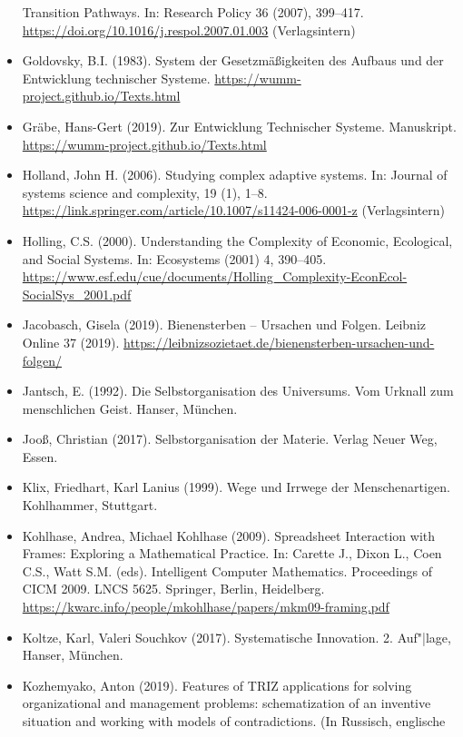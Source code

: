\documentclass[11pt,a4paper]{article}
\begin{document}
\begin{itemize}
  Transition Pathways. In: Research Policy 36 (2007), 399–417.\\
  \url{https://doi.org/10.1016/j.respol.2007.01.003} (Verlagsintern)
\item Goldovsky, B.I. (1983). System der Gesetzmäßigkeiten des Aufbaus und der
  Entwicklung technischer Systeme.
  \url{https://wumm-project.github.io/Texts.html} 
\item Gräbe, Hans-Gert (2019). Zur Entwicklung Technischer Systeme.
  Manuskript. \\ \url{https://wumm-project.github.io/Texts.html}
\item Holland, John H. (2006). Studying complex adaptive systems. In: Journal
  of systems science and complexity, 19 (1),
  1–8.\\ \url{https://link.springer.com/article/10.1007/s11424-006-0001-z}
  (Verlagsintern)
\item Holling, C.S. (2000). Understanding the Complexity of Economic,
  Ecological, and Social Systems. In: Ecosystems (2001) 4, 390–405.
  \url{https://www.esf.edu/cue/documents/Holling_Complexity-EconEcol-SocialSys_2001.pdf}
\item Jacobasch, Gisela (2019). Bienensterben -- Ursachen und Folgen.  Leibniz
  Online 37 (2019).
  \url{https://leibnizsozietaet.de/bienensterben-ursachen-und-folgen/}
\item Jantsch, E. (1992). Die Selbstorganisation des Universums. Vom Urknall
  zum menschlichen Geist.  Hanser, München.
\item Jooß, Christian (2017). Selbstorganisation der Materie.  Verlag Neuer
  Weg, Essen.
\item Klix, Friedhart, Karl Lanius (1999). Wege und Irrwege der
  Menschenartigen.  Kohlhammer, Stuttgart.
\item Kohlhase, Andrea, Michael Kohlhase (2009). Spreadsheet Interaction with
  Frames: Exploring a Mathematical Practice. In: Carette J., Dixon L., Coen
  C.S., Watt S.M. (eds). Intelligent Computer Mathematics. Proceedings of CICM
  2009.  LNCS 5625. Springer, Berlin, Heidelberg.\\
  \url{https://kwarc.info/people/mkohlhase/papers/mkm09-framing.pdf}  
\item Koltze, Karl, Valeri Souchkov (2017). Systematische Innovation.
  2. Auf"|lage, Hanser, München.
\item Kozhemyako, Anton (2019). Features of TRIZ applications for solving
  organizational and management problems: schematization of an inventive
  situation and working with models of contradictions. (In Russisch, englische

\end{itemize}
\end{document}
